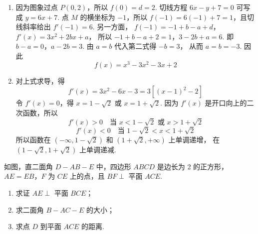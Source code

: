 \begin{solution}
\begin{enumerate}
\item 因为图象过点 \(P(0,2)\)，所以 \(f(0)=d=2\). 切线方程
\(6x-y+7=0\) 可写成 \(y=6x+7\). 点 \(M\) 的横坐标为 \(-1\)，所以
\(f(-1)=6(-1)+7=1\)，且切线斜率给出 \(f'(-1)=6\). 另一方面，
\(f(-1)=-1+b-a+d\)，\(f'(x)=3x^2+2bx+a\)，
所以
\(-1+b-a+2=1\)，\(3-2b+a=6\).
即 \(b-a=0\)，\(a-2b=3\). 由 \(a=b\) 代入第二式得 \(-b=3\)，
从而 \(a=b=-3\). 因此
\[
f(x)=x^3-3x^2-3x+2
\]
\item 对上式求导，得
\[
f'(x)=3x^2-6x-3=3\left[(x-1)^2-2\right]
\]
令 \(f'(x)=0\)，得 \(x=1-\sqrt{2}\) 或 \(x=1+\sqrt{2}\). 因为
\(f'(x)\) 是开口向上的二次函数，所以
\[
f'(x)>0\quad\text{当 }x<1-\sqrt{2}\text{ 或 }x>1+\sqrt{2}
\]
\[
f'(x)<0\quad\text{当 }1-\sqrt{2}<x<1+\sqrt{2}
\]
所以函数在 \((-\infty,1-\sqrt{2})\) 和 \((1+\sqrt{2},+\infty)\) 上单调递增，
在 \((1-\sqrt{2},1+\sqrt{2})\) 上单调递减.
\end{enumerate}
\end{solution}

\begin{problem}
如图，直二面角 \(D - AB - E\) 中，四边形 \(ABCD\) 是边长为 2 的正方形，\(AE = EB\)，\(F\) 为 \(CE\) 上的点，且 \(BF \perp\) 平面 \(ACE\).

\begin{enumerate}
\item 求证 \(AE \perp\) 平面 \(BCE\)；
\item 求二面角 \(B - AC - E\) 的大小；
\item 求点 \(D\) 到平面 \(ACE\) 的距离.
\end{enumerate}


\end{problem}

